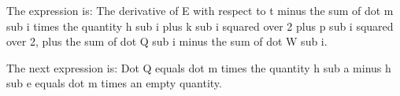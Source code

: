 The expression is:
The derivative of E with respect to t minus the sum of dot m sub i times the quantity h sub i plus k sub i squared over 2 plus p sub i squared over 2, plus the sum of dot Q sub i minus the sum of dot W sub i.

The next expression is:
Dot Q equals dot m times the quantity h sub a minus h sub e equals dot m times an empty quantity.
